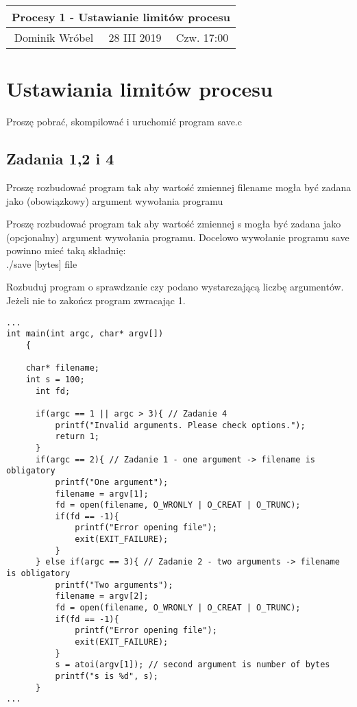 \documentclass[a4paper,15pt]{article}
\newcommand{\assignment}[2]{
    \begin{tcolorbox}[colback=black!5!white,colframe=black,title={Zadanie #1}]
        #2
    \end{tcolorbox}
}
\begin{document}
\begin{table}
\begin{center}
\begin{tabular}{|c|c|c|}
\hline
\multicolumn{3}{|c|}{\textbf{Procesy 1 - Ustawianie limitów procesu}} \\ \hline Dominik Wróbel & 28 III 2019 & Czw. 17:00 \\ \hline

\end{tabular}
\end{center}
\end{table}

\tableofcontents

\newpage
\section{Ustawiania limitów procesu}

\assignment{}{Proszę pobrać, skompilować i uruchomić program save.c}

\subsection{Zadania 1,2 i 4}
\assignment{1}{Proszę rozbudować program tak aby wartość zmiennej filename mogła być zadana jako (obowiązkowy) argument wywołania programu}
\assignment{2}{Proszę rozbudować program tak aby wartość zmiennej s mogła być zadana jako (opcjonalny) argument wywołania programu. Docelowo wywołanie programu save powinno mieć taką składnię: \\ ./save [bytes] file}
\assignment{4}{Rozbuduj program o sprawdzanie czy podano wystarczającą liczbę argumentów. Jeżeli nie to zakończ program zwracając 1.}

\begin{lstlisting}[style=CStyle, label=some-code, caption=Zadania 1 2 i 4 - plik save.c - poczatek funkcji main]
...
int main(int argc, char* argv[])
    {

    char* filename;
    int s = 100;
	  int fd;	
	    
	  if(argc == 1 || argc > 3){ // Zadanie 4
          printf("Invalid arguments. Please check options.");
          return 1;
      }
      if(argc == 2){ // Zadanie 1 - one argument -> filename is obligatory
          printf("One argument");
          filename = argv[1];
          fd = open(filename, O_WRONLY | O_CREAT | O_TRUNC);
          if(fd == -1){
              printf("Error opening file");
              exit(EXIT_FAILURE);
          }
      } else if(argc == 3){ // Zadanie 2 - two arguments -> filename is obligatory
          printf("Two arguments");
          filename = argv[2];
          fd = open(filename, O_WRONLY | O_CREAT | O_TRUNC);
          if(fd == -1){
              printf("Error opening file");
              exit(EXIT_FAILURE);
          }
          s = atoi(argv[1]); // second argument is number of bytes
          printf("s is %d", s);
      }
...
\end{lstlisting}
\end{document}
